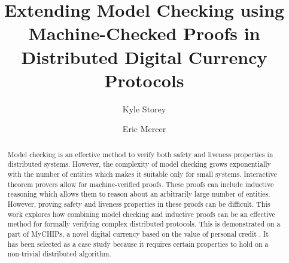 \documentclass[runningheads]{llncs}
\begin{document}
\title{Extending Model Checking using Machine-Checked Proofs in Distributed Digital Currency Protocols}

\author{Kyle Storey \and Eric Mercer}

\maketitle

\begin{abstract}

Model checking is an effective method to verify both safety and liveness properties in distributed systems. However, the complexity of model checking grows exponentially with the number of entities which makes it suitable only for small systems.
Interactive theorem provers allow for machine-verified proofs. These proofs can include inductive reasoning which allows them to reason about an arbitrarily large number of entities. However, proving safety and liveness properties in these proofs can be difficult.
This work explores how combining model checking and inductive proofs can be an effective method for formally verifying complex distributed protocols. This is demonstrated on a part of MyCHIPs, a novel digital currency based on the value of personal credit \cite{bateman_myCHIPs}. It has been selected as a case study because it requires certain properties to hold on a non-trivial distributed algorithm. 


\end{abstract}

\end{document}
